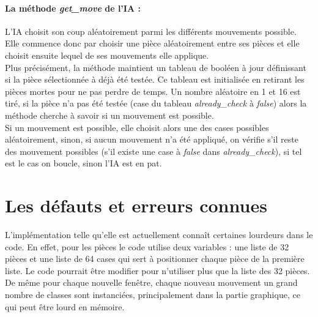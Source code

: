 \documentclass[a4paper]{article}
\begin{document}
\paragraph{La méthode \textit{get\_move} de l'IA :}L'IA choisit son coup aléatoirement parmi les différents mouvements possible. Elle commence donc par choisir une pièce aléatoirement entre ses pièces et elle choisit ensuite lequel de ses mouvements elle applique. \\ 

Plus précisément, la méthode maintient un tableau de booléen à jour définissant si la pièce sélectionnée à déjà été testée. Ce tableau est initialisée en retirant les pièces mortes pour ne pas perdre de temps. Un nombre aléatoire en 1 et 16 est tiré, si la pièce n'a pas été testée (case du tableau \textit{already\_check} à \textit{false}) alors la méthode cherche à savoir si un mouvement est possible. \\

Si un mouvement est possible, elle choisit alors une des cases possibles aléatoirement, sinon, si aucun mouvement n'a été appliqué, on vérifie s'il reste des mouvement possibles (s'il existe une case à \textit{false} dans \textit{already\_check}), si tel est le cas on boucle, sinon l'IA est en pat. 

\section{Les défauts et erreurs connues}

L'implémentation telle qu'elle est actuellement connaît certaines lourdeurs dans le code. En effet, pour les pièces le code utilise deux variables : une liste de 32 pièces et une liste de 64 cases qui sert à positionner chaque pièce de la première liste. Le code pourrait être modifier pour n'utiliser plus que la liste des 32 pièces. \\

De même pour chaque nouvelle fenêtre, chaque nouveau mouvement un grand nombre de classes sont instanciées, principalement dans la partie graphique, ce qui peut être lourd en mémoire. 
\end{document}
